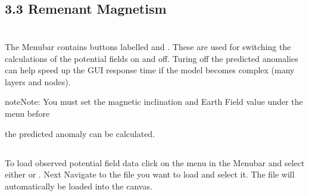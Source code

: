 \documentclass[a4paper,12pt,english]{sphinxmanual}
\begin{document}
\begin{DUlineblock}{0em}
\item[] 
\end{DUlineblock}


\subsection{3.3 Remenant Magnetism}
\label{\detokenize{manual__layer_attributes:remenant-magnetism}}

\section{}
\label{\detokenize{manual__PF:potential-field-data}}\label{\detokenize{manual__PF::doc}}
\begin{DUlineblock}{0em}
\item[] 
\end{DUlineblock}


\subsection{}
\label{\detokenize{manual__PF:potential-field-calculations}}
The Menubar contains buttons labelled  and .
These are used for switching the calculations of the potential fields on and off. Turing off the predicted anomalies
can help speed up the GUI response time if the model becomes complex (many layers and nodes).

\begin{sphinxadmonition}{note}{Note:}
You must set the magnetic inclination and Earth Field value under the  menu before
\end{sphinxadmonition}

the predicted anomaly can be calculated.

\begin{DUlineblock}{0em}
\item[] 
\end{DUlineblock}


\subsection{}
\label{\detokenize{manual__PF:loading-observed-potential-field-data}}
To load observed potential field data click on the  menu in the Menubar and select either
 or .
Next Navigate to the file you want to load and select it.
The file will automatically be loaded into the canvas.
\end{document}
